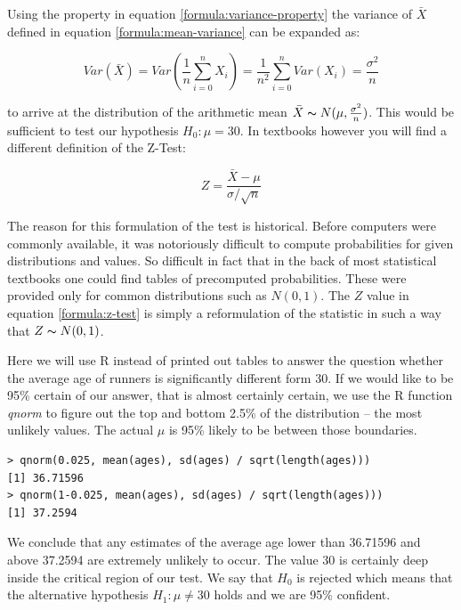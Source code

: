 \documentclass{tufte-book} %
\begin{document}
Using the property in equation \ref{formula:variance-property} the variance of $\bar{X}$ defined in equation \ref{formula:mean-variance} can be expanded as:

\begin{equation}
Var(\bar{X}) = Var(\frac{1}{n}\sum_{i=0}^n X_i) = \frac{1}{n^2}\sum_{i=0}^n Var(X_i) = \frac{\sigma^2}{n}
\end{equation}

to arrive at the distribution of the arithmetic mean $\bar{X} \thicksim N(\mu, \frac{\sigma^2}{n})$. This would be sufficient to test our hypothesis $H_0: \mu = 30$. In textbooks however you will find a different definition of the \hbox{Z-Test}:

\begin{equation}
Z = \frac{\bar{X} - \mu}{\sigma / \sqrt{n}}
\label{formula:z-test}
\end{equation}

The reason for this formulation of the test is historical. Before computers were commonly available, it was notoriously difficult to compute probabilities for given distributions and values. So difficult in fact that in the back of most statistical textbooks one could find tables of precomputed probabilities. These were provided only for common distributions such as $N(0, 1)$. The $Z$ value in equation \ref{formula:z-test} is simply a reformulation of the statistic in such a way that $Z \thicksim N(0, 1)$.

Here we will use R instead of printed out tables to answer the question whether the average age of runners is significantly different form 30. If we would like to be 95\% certain of our answer, that is almost certainly certain, we use the R function {\em qnorm} to figure out the top and bottom 2.5\% of the distribution -- the most unlikely values. The actual $\mu$ is 95\% likely to be between those boundaries.

\begin{verbatim}
> qnorm(0.025, mean(ages), sd(ages) / sqrt(length(ages)))
[1] 36.71596
> qnorm(1-0.025, mean(ages), sd(ages) / sqrt(length(ages)))
[1] 37.2594
\end{verbatim}

We conclude that any estimates of the average age lower than 36.71596 and above 37.2594 are extremely unlikely to occur. The value 30 is certainly deep inside the critical region of our test. We say that $H_0$ is rejected which means that the alternative hypothesis $H_1: \mu \neq 30$ holds and we are 95\% confident. 
\end{document}
